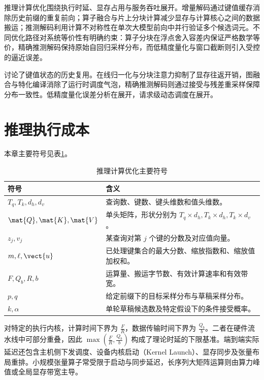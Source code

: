\documentclass[../textbook.tex]{subfiles}
\begin{document}
\fi
{}

推理计算优化围绕执行时延、显存占用与服务吞吐展开。增量解码通过键值缓存消除历史前缀的重复前向；算子融合与片上分块计算减少显存与计算核心之间的数据搬运；推测解码利用计算不对称性在单次大模型前向中并行验证多个候选词元。不同优化路径对系统等价性有明确约束：算子分块在浮点舍入容差内保证严格数学等价，精确推测解码保持原始自回归采样分布，而低精度量化与窗口截断则引入受控的逼近误差。

讨论了键值状态的历史复用。在线归一化与分块注意力抑制了显存往返开销，图融合与特化编译消除了运行时调度气泡，精确推测解码则通过接受与残差重采样保障分布一致性。低精度量化误差分析在展开，请求级动态调度在展开。

\section{推理执行成本}

本章主要符号见表\ref{tab:inference-algorithms-symbols}。
\begin{table}[htbp]
\centering
\caption{推理计算优化主要符号}\label{tab:inference-algorithms-symbols}
\begin{tabular}{ll}
\toprule
符号 & 含义\\
\midrule
$T_q,T_k,d_h,d_v$ & 查询数、键数、键头维数和值头维数。\\
$\mat{Q},\mat{K},\mat{V}$ & 单头矩阵，形状分别为 $T_q\times d_h,T_k\times d_h,T_k\times d_v$。\\
$z_j,v_j$ & 某查询对第 $j$ 个键的分数及对应值向量。\\
$m,\ell,\vect{u}$ & 已处理键集合的最大分数、缩放指数和、缩放值加权和。\\
$F,Q_b,R,b$ & 运算量、搬运字节数、有效计算速率和有效带宽。\\
$p,q$ & 给定前缀下的目标采样分布与草稿采样分布。\\
$k,\alpha$ & 单轮草稿候选数及特定假设下的条件接受概率。\\
\bottomrule
\end{tabular}
\end{table}

对特定的执行内核，计算时间下界为 $\frac{F}{R}$，数据传输时间下界为 $\frac{Q_b}{b}$。二者在硬件流水线中可部分重叠，因此 $\max(\frac{F}{R},\frac{Q_b}{b})$ 构成了理论时延的下限基准。端到端实际延迟还包含主机侧下发调度、设备内核启动（Kernel Launch）、显存同步及张量布局重排。小规模张量算子常受限于启动与同步延迟，长序列大矩阵运算则由算力峰值或全局显存带宽主导。
\end{document}
